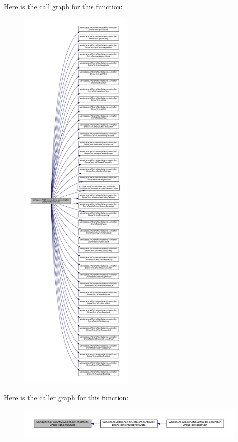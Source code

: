 Here is the call graph for this function\+:\nopagebreak
\begin{figure}[H]
\begin{center}
\leavevmode
\includegraphics[height=550pt]{classworkspace_1_1_a_r_drone_nav_data_1_1src_1_1controller_1_1_drone_test_a05fb24f0297add05fe4e8aae1c4a5c77_cgraph}
\end{center}
\end{figure}




Here is the caller graph for this function\+:\nopagebreak
\begin{figure}[H]
\begin{center}
\leavevmode
\includegraphics[width=350pt]{classworkspace_1_1_a_r_drone_nav_data_1_1src_1_1controller_1_1_drone_test_a05fb24f0297add05fe4e8aae1c4a5c77_icgraph}
\end{center}
\end{figure}


